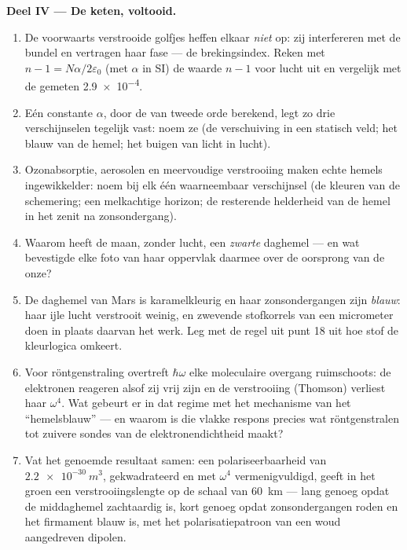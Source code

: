 \begin{problem}
\medskip\noindent\textbf{Deel IV --- De keten, voltooid.}
\begin{enumerate}[resume]
  \item De voorwaarts verstrooide golfjes heffen elkaar \emph{niet} op:
        zij interfereren met de bundel en vertragen haar fase --- de
        brekingsindex. Reken met $n - 1 = N\alpha/2\varepsilon_0$ (met
        $\alpha$ in SI) de waarde $n - 1$ voor lucht uit en vergelijk met
        de gemeten \num{2.9e-4}.
  \item Eén constante $\alpha$, door de  van tweede orde
        berekend, legt zo drie verschijnselen tegelijk vast: noem ze (de
        verschuiving in een statisch veld; het blauw van de hemel; het
        buigen van licht in lucht).
  \item Ozonabsorptie, aerosolen en meervoudige verstrooiing maken echte
        hemels ingewikkelder: noem bij elk één waarneembaar verschijnsel
        (de kleuren van de schemering; een melkachtige horizon; de
        resterende helderheid van de hemel in het zenit na zonsondergang).
  \item Waarom heeft de maan, zonder lucht, een \emph{zwarte} daghemel
        --- en wat bevestigde elke foto van haar oppervlak daarmee over de
        oorsprong van de onze?
  \item De daghemel van Mars is karamelkleurig en haar zonsondergangen
        zijn \emph{blauw}: haar ijle lucht verstrooit weinig, en zwevende
        stofkorrels van een micrometer doen in plaats daarvan het werk.
        Leg met de regel uit punt 18 uit hoe stof de kleurlogica omkeert.
  \item Voor röntgenstraling overtreft $\hbar\omega$ elke moleculaire
        overgang ruimschoots: de elektronen reageren alsof zij vrij zijn
        en de verstrooiing (Thomson) verliest haar $\omega^4$. Wat gebeurt
        er in dat regime met het mechanisme van het ``hemelsblauw'' --- en
        waarom is die vlakke respons precies wat röntgenstralen tot
        zuivere sondes van de elektronendichtheid maakt?
  \item Vat het genoemde resultaat samen: een polariseerbaarheid van
        $\qty{2.2e-30}{m^3}$, gekwadrateerd en met $\omega^4$
        vermenigvuldigd, geeft in het groen een verstrooiingslengte op de
        schaal van \qty{60}{km} --- lang genoeg opdat de middaghemel
        zachtaardig is, kort genoeg opdat zonsondergangen roden en het
        firmament blauw is, met het polarisatiepatroon van een woud
        aangedreven dipolen.
\end{enumerate}
\end{problem}

